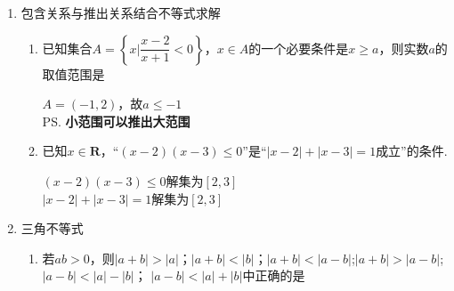 \begin{enumerate}
\begin{enumerate}
\begin{jieda}
        \end{jieda}
        \item 若关于$x$的不等式$ax + 6 + |x^2 - ax - 6| \geq 4$恒成立，$a$的取值范围是\blkda{$[-1, 1]$}
        \begin{jieda}
            原不等式转化为$|x^2 - ax - 6| \geq -2 - ax$恒成立，即$x^2 - ax - 6 \geq -2 - ax$与$x^2 - ax - 6 \leq 2 + ax$解集的并集为$\mathbf{R}$ \\
            前者解集为$(-\infty, -2] \cup [2, +\infty)$，后者解集为$[a-\sqrt{a^2+8}, a + \sqrt{a^2+8}]$，故$(-2, 2) \subseteq [a-\sqrt{a^2+8}, a + \sqrt{a^2+8}]$，因此$a \in [-1, 1]$
        \end{jieda}
        \item 已知函数$f(x) = |x-2| + |x-a|$，若对于任意的$x \in [1, 2]$，$f(x) \geq |x-4|$恒成立，实数$a$的范围是\blkda[4]{$(-\infty, -1] \cup [4, +\infty)$}
        \begin{jieda}
            当$x \in [1, 2]$，$f(x) \geq |x-4|$即$2-x + |x-a| \geq 4-x$，整理得$|x-a| \geq 2$，由绝对值的几何意义可知$a \in (-\infty, -1] \cup [4, +\infty)$ \\
            \ps 有自变量的具体范围的时候，可以先看一下绝对值是否可以直接去掉.
        \end{jieda}
        \end{enumerate}
    \item 包含关系与推出关系结合不等式求解
    \begin{enumerate}
        \item 已知集合$A = \left\{x | \dfrac{x-2}{x+1} < 0\right\}$，$x \in A$的一个必要条件是$x \geq a$，则实数$a$的取值范围是
        \begin{jieda}
            $A = (-1, 2)$，故$a \leq -1$ \\
            \ps \textbf{小范围可以推出大范围}
        \end{jieda}
        \item 已知$x \in \mathbf{R}$，“$(x-2)(x-3) \leq 0$”是“$|x-2|+|x-3| = 1$成立”的条件.
        \begin{jieda}
            $(x-2)(x-3) \leq 0$解集为$[2, 3]$ \\
            $|x-2|+|x-3| = 1$解集为$[2, 3]$
        \end{jieda}
    \end{enumerate}
    \item 三角不等式
    \begin{enumerate}
        \item 若$ab > 0$，则$|a+b| > |a|$；$|a+b| < |b|$；$|a+b| < |a-b|$;$|a+b| > |a-b|$; $|a-b| < |a| - |b|$； $|a -b| < |a| + |b|$中正确的是

\end{enumerate}
\end{enumerate}
